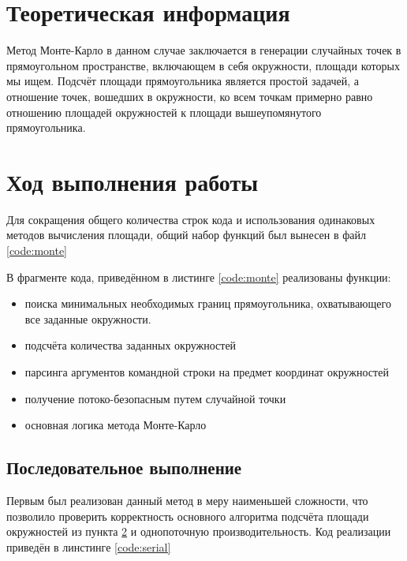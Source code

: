 \section{Теоретическая информация}
Метод Монте-Карло в данном случае заключается в генерации случайных точек в прямоугольном пространстве, включающем в себя окружности, площади которых мы ищем. Подсчёт площади прямоугольника является простой задачей, а отношение точек, вошедших в окружности, ко всем точкам примерно равно отношению площадей окружностей к площади вышеупомянутого прямоугольника.

\section{Ход выполнения работы}
\label{sec:monte}

Для сокращения общего количества строк кода и использования одинаковых методов вычисления площади, общий набор функций был вынесен в файл \ref{code:monte}


\parindent=1cm %

В фрагменте кода, приведённом в листинге \ref{code:monte} реализованы функции:

\begin{itemize}
\item поиска минимальных необходимых границ прямоугольника, охватывающего все заданные окружности.
\item подсчёта количества заданных окружностей
\item парсинга аргументов командной строки на предмет координат окружностей
\item получение потоко-безопасным путем случайной точки
\item основная логика метода Монте-Карло
\end{itemize}

\subsection{Последовательное выполнение}
Первым был реализован данный метод в меру наименьшей сложности, что позволило проверить корректность основного алгоритма подсчёта площади окружностей из пункта \ref{sec:monte} и однопоточную производительность. Код реализации приведён в линстинге \ref{code:serial}


\parindent=1cm %

